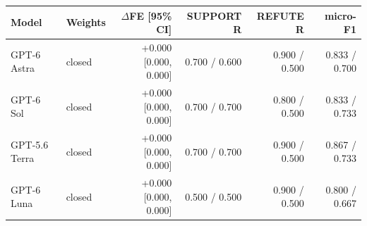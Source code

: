 \scriptsize
\setlength{\tabcolsep}{5pt}
\begin{tabular}{@{}llrrrr@{}}
\toprule
Model & Weights & $\Delta$FE [95\% CI] & SUPPORT R & REFUTE R & micro-F1 \\
\midrule
GPT-6 Astra & closed & +0.000 [0.000, 0.000] & 0.700 / 0.600 & 0.900 / 0.500 & 0.833 / 0.700 \\
GPT-6 Sol & closed & +0.000 [0.000, 0.000] & 0.700 / 0.700 & 0.800 / 0.500 & 0.833 / 0.733 \\
GPT-5.6 Terra & closed & +0.000 [0.000, 0.000] & 0.700 / 0.700 & 0.900 / 0.500 & 0.867 / 0.733 \\
GPT-6 Luna & closed & +0.000 [0.000, 0.000] & 0.500 / 0.500 & 0.900 / 0.500 & 0.800 / 0.667 \\
\bottomrule
\end{tabular}

